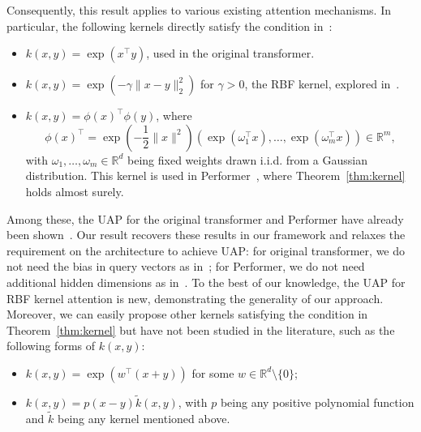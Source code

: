 \documentclass{article}
\newcommand{\ql}[1]{{\footnotesize\textcolor{red}{QL: #1}}}
\begin{document}
Consequently, this result applies to various existing attention mechanisms.
In particular, the following kernels directly satisfy the condition in~:
\begin{itemize}
    \item $k(x,y)=\exp(x^\top y)$, used in the original transformer.
    \item $k(x,y)=\exp(-\gamma \|x-y\|_2^2)$ for $\gamma > 0$, the RBF kernel, explored in~\cite{tsai2019transformer}.
    \item $k(x,y)=\phi(x)^\top\phi(y)$, where
    \begin{equation}
        \phi(x)^{\top}=\exp \left(-\frac{1}{2}\|x\|^2\right)\left(\exp ({\omega}_1^{\top} x), \ldots, \exp ({\omega}_m^{\top} x)\right)\in\mathbb{R}^m,
    \end{equation}
    with $\omega_1,\dots, \omega_m\in\mathbb{R}^d$ being fixed weights drawn i.i.d. from a Gaussian distribution. This kernel is used in Performer~\cite{choromanski2020rethinking}, where Theorem~\ref{thm:kernel} holds almost surely.
\end{itemize}
Among these, the UAP for the original transformer and Performer have already been shown~\cite{yun2019transformers,alberti2023sumformer}. Our result recovers these results in our framework and relaxes the requirement on the architecture to achieve UAP: for original transformer, we do not need the bias in query vectors as in~\cite{yun2019transformers}; for Performer, we do not need additional hidden dimensions as in~\cite{alberti2023sumformer}.
To the best of our knowledge, the UAP for RBF kernel attention is new, demonstrating the generality of our approach. Moreover, we can easily propose other kernels satisfying the condition in Theorem~\ref{thm:kernel} but have not been studied in the literature, such as the following forms of $k(x,y):$
 \begin{itemize}
\item $k(x,y)=\exp(w^\top (x+y))$ for some $w\in\mathbb R^d\setminus\{0\}$;
        \item $k(x,y)=p(x-y)\tilde k(x,y)$, with $p$ being any positive polynomial function and $\tilde k$ being any kernel mentioned above.
 \end{itemize}



\end{document}
